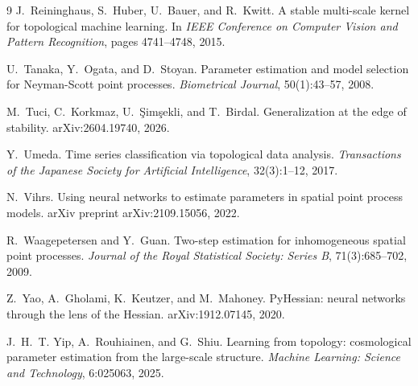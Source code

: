 \documentclass[11pt,a4paper]{article}
\begin{document}
{\begin{thebibliography}{9}
J.~Reininghaus, S.~Huber, U.~Bauer, and R.~Kwitt.
\newblock A stable multi-scale kernel for topological machine learning.
\newblock In \emph{IEEE Conference on Computer Vision and Pattern Recognition},
pages 4741--4748, 2015.

U.~Tanaka, Y.~Ogata, and D.~Stoyan.
\newblock Parameter estimation and model selection for Neyman-Scott point
processes.
\newblock \emph{Biometrical Journal}, 50(1):43--57, 2008.

M.~Tuci, C.~Korkmaz, U.~\c{S}im\c{s}ekli, and T.~Birdal.
\newblock Generalization at the edge of stability.
\newblock arXiv:2604.19740, 2026.

Y.~Umeda.
\newblock Time series classification via topological data analysis.
\newblock \emph{Transactions of the Japanese Society for Artificial
Intelligence}, 32(3):1--12, 2017.

N.~Vihrs.
\newblock Using neural networks to estimate parameters in spatial point process
models.
\newblock arXiv preprint arXiv:2109.15056, 2022.

R.~Waagepetersen and Y.~Guan.
\newblock Two-step estimation for inhomogeneous spatial point processes.
\newblock \emph{Journal of the Royal Statistical Society: Series B},
71(3):685--702, 2009.

Z.~Yao, A.~Gholami, K.~Keutzer, and M.~Mahoney.
\newblock PyHessian: neural networks through the lens of the Hessian.
\newblock arXiv:1912.07145, 2020.

J.~H.~T. Yip, A.~Rouhiainen, and G.~Shiu.
\newblock Learning from topology: cosmological parameter estimation from the
large-scale structure.
\newblock \emph{Machine Learning: Science and Technology}, 6:025063, 2025.
\end{thebibliography}
}
\end{document}
